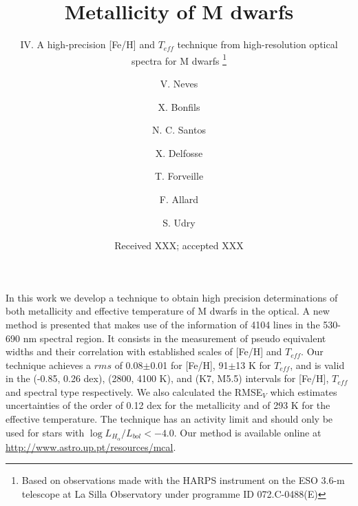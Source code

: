 \documentclass[referee]{aa}
\begin{document}
 


   \title{Metallicity of M dwarfs }

  \subtitle{IV. A high-precision [Fe/H] and $T_{eff}$ technique from high-resolution optical spectra for M dwarfs \thanks{Based on observations made with the HARPS instrument on the ESO 3.6-m telescope at La Silla Observatory under programme ID 072.C-0488(E)}}

\author{ V. Neves \and X. Bonfils \and
  N. C. Santos \and X. Delfosse \and
  T. Forveille  \and F. Allard  \and
  S. Udry}

   \date{Received XXX; accepted XXX}

 
  \abstract
{}
   {In this work we develop a technique to obtain high precision determinations of both metallicity and effective temperature of M dwarfs in the optical.}
   {A new method is presented that makes use of the information of 4104 lines in the 530-690 nm spectral region. It consists in the measurement of pseudo equivalent widths and their correlation with established scales of [Fe/H] and $T_{eff}$.}
   {Our technique achieves a $rms$ of 0.08$\pm$0.01 for [Fe/H], 91$\pm$13 K for $T_{eff}$, and is valid in the (-0.85, 0.26 dex), (2800, 4100 K), and (K7, M5.5) intervals for [Fe/H], $T_{eff}$ and spectral type respectively. We also calculated the RMSE$_{V}$ which estimates uncertainties of the order of 0.12 dex for the metallicity and of 293 K for the effective temperature. The technique has an activity limit and should only be used for stars with  $\log{L_{H_{\alpha}}/L_{bol}} < -4.0$. Our method is available online at \url{http://www.astro.up.pt/resources/mcal}.  }
   {}
\end{document}
